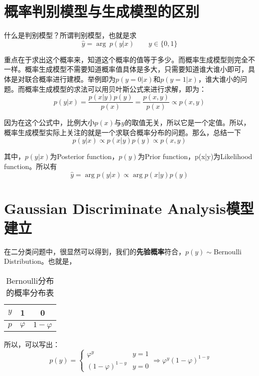 \documentclass[a4paper]{article}
\begin{document}
\section{概率判别模型与生成模型的区别}
什么是判别模型？所谓判别模型，也就是求
\begin{equation}
    \hat{y} = \mathop{\arg\max_{y}}\ p(y|x) \qquad y\in\{0,1\}
\end{equation}

重点在于求出这个概率来，知道这个概率的值等于多少。而概率生成模型则完全不一样。概率生成模型不需要知道概率值具体是多大，只需要知道谁大谁小即可，具体是对联合概率进行建模。举例即为$p(y=0|x)$和$p(y=1|x)$，谁大谁小的问题。而概率生成模型的求法可以用贝叶斯公式来进行求解，即为：
\begin{equation}
    p(y|x)=\frac{p(x|y)p(y)}{p(x)}=\frac{p(x,y)}{p(x)}\propto p(x,y)
\end{equation}

因为在这个公式中，比例大小$p(x)$与$y$的取值无关，所以它是一个定值。所以，概率生成模型实际上关注的就是一个求联合概率分布的问题。那么，总结一下
\begin{equation}
    p(y|x) \propto p(x|y)p(y) \propto p(x,y)
\end{equation}

其中，$p(y|x)$为Posterior function，$p(y)$为Prior function，p(x|y)为Likelihood function。所以有
\begin{equation}
    \hat{y} = \mathop{\arg\max_{y\in \{0,1\}}}p(y|x) \propto \mathop{\arg\max_{y\in \{0,1\}}}p(x|y)p(y)
\end{equation}

\section{Gaussian Discriminate Analysis模型建立}
在二分类问题中，很显然可以得到，我们的\textbf{先验概率}符合，$p(y)\sim$Bernoulli Distribution。也就是，
\begin{table}[H]
    \centering
    \begin{tabular}{c|cc}
         $y$ & 1 & 0 \\
         \hline
         $p$ & $\varphi$ & $1-\varphi$ \\
    \end{tabular}
    \caption{Bernoulli分布的概率分布表}
    \label{tab:my_label}
\end{table}

所以，可以写出：
\begin{equation}
    p(y)=
    \left\{
        \begin{array}{ll}
            \varphi^y & y=1 \\
            (1-\varphi)^{1-y} & y=0
        \end{array}
    \right.
    \Rightarrow
    \varphi^y(1-\varphi)^{1-y}
\end{equation}
\end{document}
